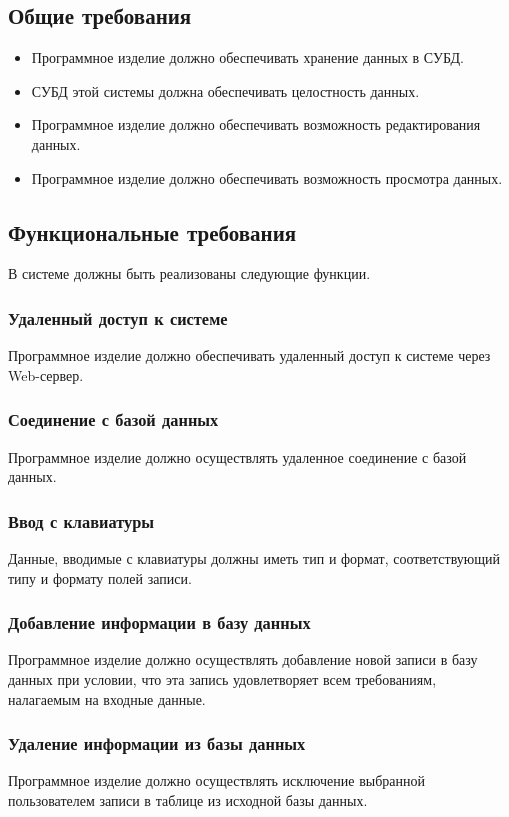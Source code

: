 \documentclass[russian,utf8,emptystyle]{eskdtext}
\begin{document}
\subsection{Общие требования}

\begin{itemize}
\item Программное изделие должно обеспечивать хранение данных в СУБД.
\item СУБД этой системы должна обеспечивать целостность данных.
\item Программное изделие должно обеспечивать возможность редактирования данных.
\item Программное изделие должно обеспечивать возможность просмотра данных.
\end{itemize}

\subsection{Функциональные требования}
В системе должны быть реализованы следующие функции.

\subsubsection{Удаленный доступ к системе}
Программное изделие должно обеспечивать удаленный доступ к системе через Web-сервер.
\subsubsection{Соединение с базой данных}
Программное изделие должно осуществлять удаленное соединение с базой данных.
\subsubsection{Ввод с клавиатуры}
Данные, вводимые с клавиатуры должны иметь тип и формат, соответствующий типу и формату полей записи.
\subsubsection{Добавление информации в базу данных}
Программное изделие должно осуществлять добавление новой записи в базу данных при условии, что эта запись удовлетворяет всем требованиям, налагаемым на входные данные.
\subsubsection{Удаление информации из базы данных}
Программное изделие должно осуществлять исключение выбранной пользователем записи в таблице из исходной базы данных.
\end{document}
